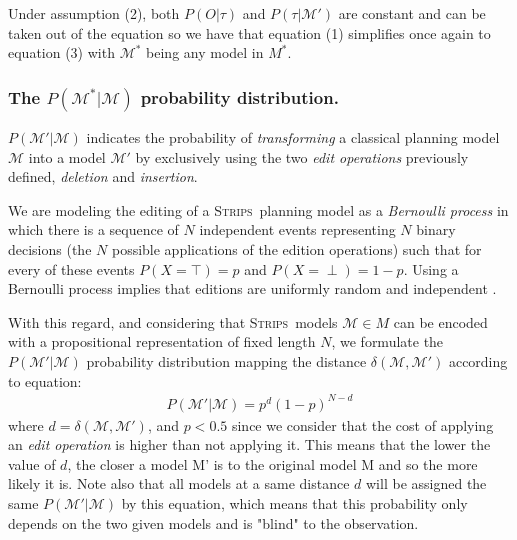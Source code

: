 \documentclass[letterpaper]{article} %
\newcommand{\strips}{\textsc{Strips}}     %
\begin{document}
Under assumption (2), both $P(O|\tau)$ and $P(\tau|\mathcal{M}')$ are constant and can be taken out of the equation so we have that equation (1) simplifies once again to equation (3) with $\mathcal{M}^*$ being any model in $M^*$. 


\subsubsection{The $P(\mathcal{M^*}|\mathcal{M})$ probability distribution.} $P(\mathcal{M'}|\mathcal{M})$ indicates the probability of {\em transforming} a classical planning model $\mathcal{M}$ into a model $\mathcal{M'}$ by exclusively using the two {\em edit operations} previously defined, {\em deletion} and {\em insertion}.

We are modeling the editing of a \strips\ planning model as a {\em Bernoulli process} in which there is a sequence of $N$ independent events representing $N$ binary decisions (the $N$ possible applications of the edition operations) such that for every of these events $P(X=\top)=p$ and $P(X=\perp)=1-p$. Using a Bernoulli process implies that editions are uniformly random and independent \cite{devroye2013probabilistic}.

With this regard, and considering that \strips\ models $\mathcal{M}\in M$ can be encoded with a propositional representation of fixed length $N$, we formulate the $P(\mathcal{M'}|\mathcal{M})$ probability distribution mapping the distance $\delta(\mathcal{M},\mathcal{M'})$ according to equation:
\begin{align}
P(\mathcal{M'}|\mathcal{M}) = p^d  (1-p)^{N-d}
\end{align}
where $d=\delta(\mathcal{M},\mathcal{M}')$, and $p<0.5$ since we consider that the cost of applying an {\em edit operation} is higher than not applying it. This means that the lower the value of $d$, the closer a model M' is to the original model M and so the more likely it is. Note also that all models at a same distance $d$ will be assigned the same $P(\mathcal{M'}|\mathcal{M})$ by this equation, which means that this probability only depends on the two given models and is "blind" to the observation.
\end{document}
